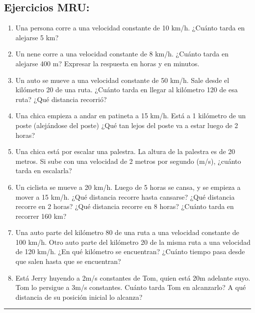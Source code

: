 \subsection*{Ejercicios MRU:}

\begin{enumerate}

\item Una persona corre a una velocidad constante de 10 km/h. ¿Cuánto tarda en alejarse 5 km? %

\item Un nene corre a una velocidad constante de 8 km/h. ¿Cuánto tarda en alejarse 400 m? Expresar la respuesta en horas y en minutos. %

\item Un auto se mueve a una velocidad constante de 50 km/h. Sale desde el kilómetro 20 de una ruta. ¿Cuánto tarda en llegar al kilómetro 120 de esa ruta? ¿Qué distancia recorrió? %

\item Una chica empieza a andar en patineta a 15 km/h. Está a 1 kilómetro de un poste (alejándose del poste) ¿Qué tan lejos del poste va a estar luego de 2 horas?

\item Una chica está por escalar una palestra. La altura de la palestra es de 20 metros. Si sube con una velocidad de 2 metros por segundo (m/s), ¿cuánto tarda en escalarla?

\item Un ciclista se mueve a 20 km/h. Luego de 5 horas se cansa, y se empieza a mover a 15 km/h. ¿Qué distancia recorre hasta cansarse? ¿Qué distancia recorre en 2 horas? ¿Qué distancia recorre en 8 horas? ¿Cuánto tarda en recorrer 160 km? %

\item Una auto parte del kilómetro 80 de una ruta a una velocidad constante de 100 km/h. Otro auto parte del kilómetro 20 de la misma ruta a una velocidad de 120 km/h. ¿En qué kilómetro se encuentran? ¿Cuánto tiempo pasa desde que salen hasta que se encuentran? %

\item Está Jerry huyendo a 2m/s constantes de Tom, quien está 20m adelante suyo. Tom lo persigue a 3m/s constantes. Cuánto tarda Tom en alcanzarlo? A qué distancia de su posición inicial lo alcanza?
\end{enumerate}

\hrule

